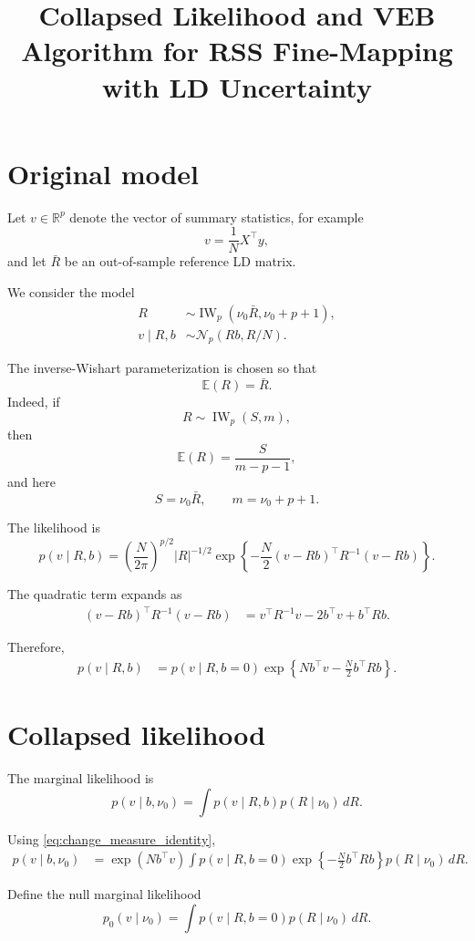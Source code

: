 \documentclass[11pt]{article}
\title{Collapsed Likelihood and VEB Algorithm for RSS Fine-Mapping with LD Uncertainty}
\author{}
\date{}
\newcommand{\Rbar}{\bar R}
\newcommand{\nuo}{\nu_0}
\newcommand{\E}{\mathbb E}
\newcommand{\Normal}{\mathcal N}
\newcommand{\IW}{\operatorname{IW}}
\begin{document}
\maketitle

\section{Original model}

Let \(v \in \mathbb R^p\) denote the vector of summary statistics,
for example
\[
v = \frac{1}{N}X^\top y,
\]
and let \(\Rbar\) be an out-of-sample reference LD matrix.

We consider the model
\begin{align}
R &\sim \IW_p(\nuo \Rbar,\nuo+p+1), \label{eq:prior_R}\\
v \mid R,b &\sim \Normal_p(Rb,R/N). \label{eq:rss_model}
\end{align}

The inverse-Wishart parameterization is chosen so that
\[
\E(R)=\Rbar.
\]
Indeed, if
\[
R \sim \IW_p(S,m),
\]
then
\[
\E(R)=\frac{S}{m-p-1},
\]
and here
\[
S=\nuo\Rbar,
\qquad
m=\nuo+p+1.
\]

The likelihood is
\[
p(v\mid R,b)
=
\left(\frac{N}{2\pi}\right)^{p/2}
|R|^{-1/2}
\exp\left\{
-\frac N2(v-Rb)^\top R^{-1}(v-Rb)
\right\}.
\]

The quadratic term expands as
\begin{align}
(v-Rb)^\top R^{-1}(v-Rb)
&=
v^\top R^{-1}v
-2b^\top v
+b^\top Rb.
\end{align}

Therefore,
\begin{align}
p(v\mid R,b)
&=
p(v\mid R,b=0)
\exp\left\{
Nb^\top v-\frac N2 b^\top Rb
\right\}. \label{eq:change_measure_identity}
\end{align}

\section{Collapsed likelihood}

The marginal likelihood is
\[
p(v\mid b,\nuo)
=
\int p(v\mid R,b)p(R\mid \nuo)\,dR.
\]

Using \eqref{eq:change_measure_identity},
\begin{align}
p(v\mid b,\nuo)
&=
\exp(Nb^\top v)
\int
p(v\mid R,b=0)
\exp\left\{
-\frac N2 b^\top Rb
\right\}
p(R\mid \nuo)\,dR.
\end{align}

Define the null marginal likelihood
\[
p_0(v\mid \nuo)
=
\int p(v\mid R,b=0)p(R\mid \nuo)\,dR.
\]
\end{document}
